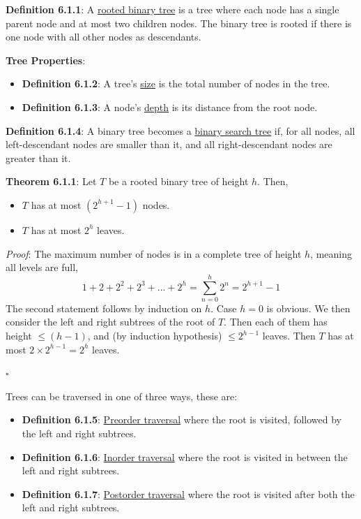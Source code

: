 \documentclass{article}
\newcommand{\separate}[1] {\vspace{#1 pt}\noindent}
\newcommand{\definition}[2]{\textbf{Definition #1}: #2\label{def:#1}}
\newcommand{\proof}[2]{\textit{Proof}: #2 \begin{flushright}\(\square\)\end{flushright}\label{prf:#1}}
\newcommand{\theorem}[3]{\textbf{Theorem #1}: #2 \par\separate{3}\proof{thm:#1}{#3}\label{thm:#1}}
\begin{document}
\definition{6.1.1}{A \underline{rooted binary tree} is a tree where each node has a single parent node and at most two children nodes. The binary tree is rooted if there is one node with all other nodes as descendants.}

\separate{5}\textbf{Tree Properties}:
\begin{itemize}
    \item \definition{6.1.2}{A tree's \underline{size} is the total number of nodes in the tree.}
    \item \definition{6.1.3}{A node's \underline{depth} is its distance from the root node.}
\end{itemize}

\separate{5}\definition{6.1.4}{A binary tree becomes a \underline{binary search tree} if, for all nodes, all left-descendant nodes are smaller than it, and all right-descendant nodes are greater than it.}

\newpage\noindent\theorem{6.1.1}{Let \(T\) be a rooted binary tree of height \(h\). Then,
\begin{itemize}
    \item \(T\) has at most \(\left(2^{h+1}-1\right)\) nodes.
    \item \(T\) has at most \(2^h\) leaves.
\end{itemize}}
{The maximum number of nodes is in a complete tree of height \(h\), meaning all levels are full,
\begin{equation}
    1 + 2 + 2^2 + 2^3 + ... + 2^h 
    = \sum^h_{n=0} 2^n 
    = 2^{h+1} - 1
\end{equation}
The second statement follows by induction on \(h\). Case \(h=0\) is obvious. We then consider the left and right subtrees of the root of \(T\).
Then each of them has height \(\leq (h-1)\), and (by induction hypothesis) \(\leq 2^{h-1}\) leaves. Then \(T\) has at most \(2 \times 2^{h-1} = 2^h\) leaves.}

\separate{5}Trees can be traversed in one of three ways, these are:
\begin{itemize}
    \item \definition{6.1.5}{\underline{Preorder traversal} where the root is visited, followed by the left and right subtrees.}
    \item \definition{6.1.6}{\underline{Inorder traversal} where the root is visited in between the left and right subtrees.}
    \item \definition{6.1.7}{\underline{Postorder traversal} where the root is visited after both the left and right subtrees.}
\end{itemize}
\end{document}

